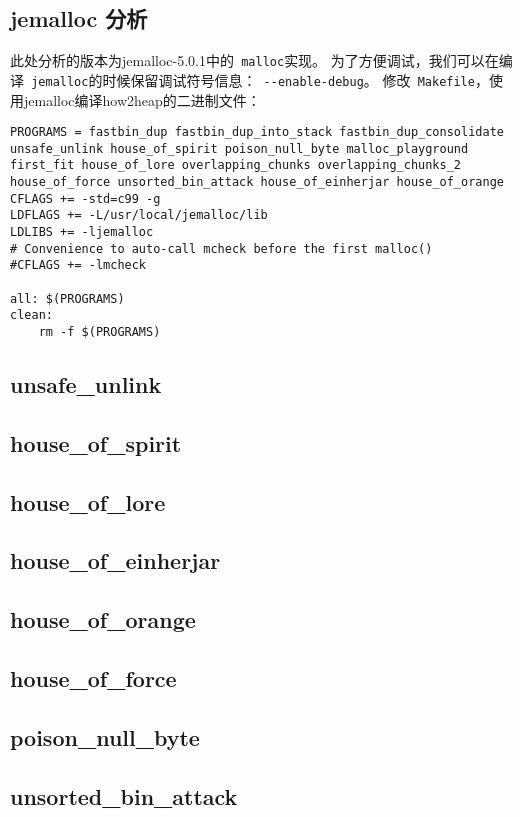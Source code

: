 \begin{center}
    \section{jemalloc 分析}
\end{center}

\setlength{\parindent}{2em}
此处分析的版本为jemalloc-5.0.1中的\verb+ malloc+实现。
为了方便调试，我们可以在编译\verb+ jemalloc+的时候保留调试符号信息：\verb+ --enable-debug+。
修改\verb+ Makefile+，使用jemalloc编译how2heap的二进制文件：
\begin{verbatim}
PROGRAMS = fastbin_dup fastbin_dup_into_stack fastbin_dup_consolidate unsafe_unlink house_of_spirit poison_null_byte malloc_playground first_fit house_of_lore overlapping_chunks overlapping_chunks_2 house_of_force unsorted_bin_attack house_of_einherjar house_of_orange
CFLAGS += -std=c99 -g
LDFLAGS += -L/usr/local/jemalloc/lib
LDLIBS += -ljemalloc
# Convenience to auto-call mcheck before the first malloc()
#CFLAGS += -lmcheck

all: $(PROGRAMS)
clean:
    rm -f $(PROGRAMS)
\end{verbatim}

\subsection{unsafe\_unlink}

\subsection{house\_of\_spirit}

\subsection{house\_of\_lore}

\subsection{house\_of\_einherjar}

\subsection{house\_of\_orange}

\subsection{house\_of\_force}

\subsection{poison\_null\_byte}

\subsection{unsorted\_bin\_attack}

\newpage